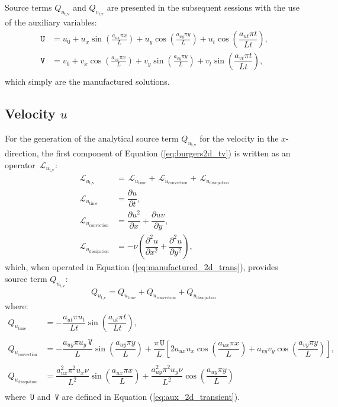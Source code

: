 \documentclass[10pt]{article}
\newcommand{\diff}[2] {\dfrac{\partial #1}{\partial #2}}
\newcommand{\Lo}{\,\mathcal{L}}
\newcommand{\U}{\,\mathtt{U}}
\newcommand{\V}{\,\mathtt{V}}
\begin{document}
Source terms $Q_{u_\text{t,v}}$ and $Q_{v_\text{t,v}}$ are presented in the subsequent sessions with the use of the auxiliary variables:
\begin{equation}
 \begin{split}
\label{eq:aux_2d_transient}
\U &= u_{0}+u_{x} \sin\left(\frac{a_{u x} \pi x}{L}\right)+u_{y} \cos\left(\frac{a_{u y} \pi y}{L}\right) + u_t \cos\left(\dfrac{a_{u t} \pi t}{Lt}\right),\\
\V &= v_{0}+v_{x} \cos\left(\frac{a_{v x} \pi x}{L}\right)+v_{y} \sin\left(\frac{a_{v y} \pi y}{L}\right)+ v_t \sin\left(\dfrac{a_{v t} \pi t}{Lt}\right),\\
\end{split}
\end{equation}
%
which simply are the manufactured solutions.

\subsection{Velocity $u$}

For the generation of the analytical source term $Q_{u_\text{t,v}}$ for the velocity in the $x$-direction, the first component of Equation  (\ref{eq:burgers2d_tv}) is written as an  operator $\Lo_{u_\text{t,v}}$:
\begin{equation*}
\begin{split}
\Lo_{u_\text{t,v}}&= \Lo_{u_\text{time}}+\Lo_{u_\text{convection}}+\Lo_{u_\text{dissipation}}\\
\Lo_{u_\text{time}}&=\diff{ u}{t},\\
\Lo_{u_\text{convection}}&= \diff{ u^2 }{x}+\diff{uv}{y},\\
\Lo_{u_\text{dissipation}}&=-\nu \left( \diff{^2u}{ x^2}+ \diff{^2u }{y^2}\right),
\end{split}
\end{equation*}
which, when operated in Equation (\ref{eq:manufactured_2d_trans}), provides source term $Q_{u_\text{t,v}}$:
$$Q_{u_\text{t,v}}= Q_{u_\text{time}}+Q_{u_\text{convection}}+Q_{u_\text{dissipation}}$$
where:
\begin{equation}
\begin{split}\label{sourceQu_tv_complete}
Q_{u_\text{time}} &= - \dfrac{a_{ut} \pi u_t }{Lt}\sin\left(\dfrac{a_{ut} \pi t}{Lt}\right), \\  
%
&\\
%
Q_{u_\text{convection}} &= -\dfrac{a_{uy} \pi u_y \V}{L} \sin\left(\dfrac{a_{uy} \pi y}{L}\right)+\dfrac{\pi \U}{L}\left[2 a_{ux} u_x \cos\left(\dfrac{a_{ux} \pi x}{L}\right)+a_{vy} v_y \cos\left(\dfrac{a_{vy} \pi y}{L}\right)\right] , \\  
%
&\\
%
Q_{u_\text{dissipation}} &= \dfrac{a_{ux}^2 \pi^2 u_x \nu}{L^2} \sin\left(\dfrac{a_{ux} \pi x}{L}\right)+\dfrac{a_{uy}^2 \pi^2 u_y \nu}{L^2} \cos\left(\dfrac{a_{uy} \pi y}{L}\right)\\  
\end{split}
\end{equation}
where $\U$ and $\V$ are defined in Equation (\ref{eq:aux_2d_transient}).
\end{document}
